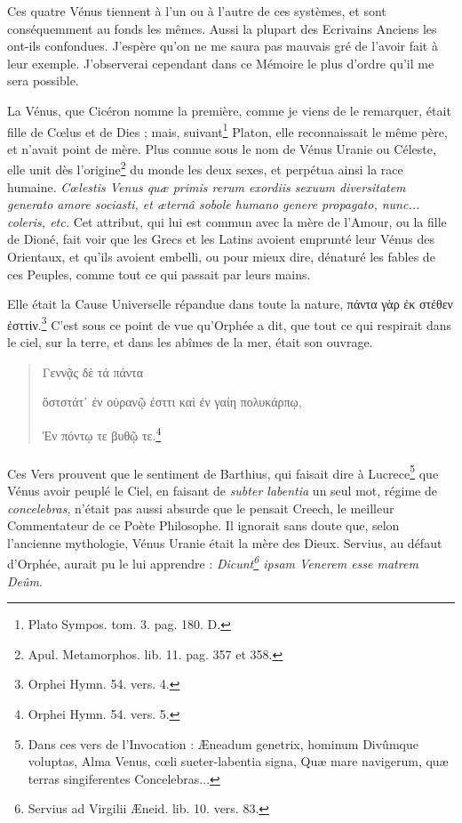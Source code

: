 \documentclass[a4paper, 11pt, oneside, polutonikogreek, french]{article}
\begin{document}
Ces quatre Vénus tiennent à l'un ou à l'autre de ces systèmes, et sont conséquemment au fonds les mêmes. Aussi la plupart des Ecrivains Anciens les ont-ils confondues. J'espère qu'on ne me saura pas mauvais gré de l'avoir fait à leur exemple. J'observerai cependant dans ce Mémoire le plus d'ordre qu'il me sera possible.

La Vénus, que Cicéron nomme la première, comme je viens de le remarquer, était fille de Cœlus et de Dies ; mais, suivant\footnote{Plato Sympos. tom. 3. pag. 180. D.} Platon, elle reconnaissait le même père, et n'avait point de mère. Plus connue sous le nom de Vénus Uranie ou Céleste, elle unit dès l'origine\footnote{Apul. Metamorphos. lib. 11. pag. 357 et 358.} du monde les deux sexes, et perpétua ainsi la race humaine. \emph{Cœlestis Venus quæ primis rerum exordiis sexuum diversitatem generato amore sociasti, et æternâ sobole humano genere propagato, nunc... coleris, etc.} Cet attribut, qui lui est commun avec la mère de l'Amour, ou la fille de Dioné, fait voir que les Grecs et les Latins avoient emprunté leur Vénus des Orientaux, et qu'ils avoient embelli, ou pour mieux dire, dénaturé les fables de ces Peuples, comme tout ce qui passait par leurs mains.

Elle était la Cause Universelle répandue dans toute la nature, πάντα γὰρ ἐκ στέθεν ἐσττὶν.\footnote{Orphei Hymn. 54. vers. 4.} C'est sous ce point de vue qu'Orphée a dit, que tout ce qui respirait dans le ciel, sur la terre, et dans les abîmes de la mer, était son ouvrage.
\begin{quotation} 
\hspace*{15mm}Γεννᾷς δὲ τά πάντα

ὅστστάτ᾽ ἐν οὐρανῷ ἐσττι καὶ ἐν γαίη πολυκάρπῳ,

Ἐν πόντῳ τε βυθῷ τε.\footnote{Orphei Hymn. 54. vers. 5.}
\end{quotation}
\paragraph{}
Ces Vers prouvent que le sentiment de Barthius, qui faisait dire à Lucrece\footnote{Dans ces vers de l'Invocation : Æneadum genetrix, hominum Divûmque voluptas, Alma Venus, cœli sueter-labentia signa, Quæ mare navigerum, quæ terras singiferentes Concelebras...} que Vénus avoir peuplé le Ciel, en faisant de \emph{subter labentia} un seul mot, régime de \emph{concelebras}, n'était pas aussi absurde que le pensait Creech, le meilleur Commentateur de ce Poète Philosophe. Il ignorait sans doute que, selon l'ancienne mythologie, Vénus Uranie était la mère des Dieux. Servius, au défaut d'Orphée, aurait pu le lui apprendre : \emph{Dicunt\footnote{Servius ad Virgilii Æneid. lib. 10. vers. 83.} ipsam Venerem esse matrem Deûm}.
\end{document}
